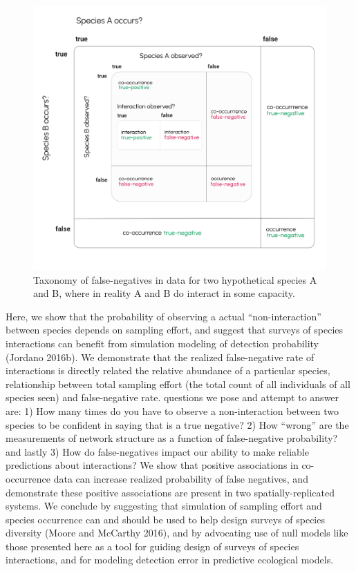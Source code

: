 \documentclass[11pt]{article}
\makeatletter
\def\maxwidth{\ifdim\Gin@nat@width>\linewidth\linewidth
\else\Gin@nat@width\fi}
\let\Oldincludegraphics\includegraphics
\renewcommand{\includegraphics}[1]{\Oldincludegraphics[width=\maxwidth]{#1}}
\makeatother
\begin{document}
\begin{figure}
\hypertarget{fig:taxonomy}{%
\centering
\includegraphics{./figures/concept_v3.png}
\caption{Taxonomy of false-negatives in data for two hypothetical
species A and B, where in reality A and B do interact in some
capacity.}\label{fig:taxonomy}
}
\end{figure}

Here, we show that the probability of observing a actual
``non-interaction'' between species depends on sampling effort, and
suggest that surveys of species interactions can benefit from simulation
modeling of detection probability (Jordano 2016b). We demonstrate that
the realized false-negative rate of interactions is directly related the
relative abundance of a particular species, relationship between total
sampling effort (the total count of all individuals of all species seen)
and false-negative rate. questions we pose and attempt to answer are: 1)
How many times do you have to observe a non-interaction between two
species to be confident in saying that is a true negative? 2) How
``wrong'' are the measurements of network structure as a function of
false-negative probability? and lastly 3) How do false-negatives impact
our ability to make reliable predictions about interactions? We show
that positive associations in co-occurrence data can increase realized
probability of false negatives, and demonstrate these positive
associations are present in two spatially-replicated systems. We
conclude by suggesting that simulation of sampling effort and species
occurrence can and should be used to help design surveys of species
diversity (Moore and McCarthy 2016), and by advocating use of null
models like those presented here as a tool for guiding design of surveys
of species interactions, and for modeling detection error in predictive
ecological models.
\end{document}
